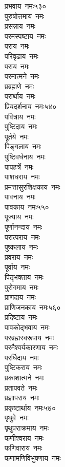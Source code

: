 \begin{multicols}{\maxColumns}
\begin{flushleft}
प्रभवाय~नमः\hfill ५३०\\
पुरुषोत्तमाय~नमः\\
प्रसन्नाय~नमः\\
परमस्पष्टाय~नमः\\
पराय~नमः\\
परिवृढाय~नमः\\
पराय~नमः\\
परमात्मने~नमः\\
प्रब्रह्मणे~नमः\\
परार्थाय~नमः\\
प्रियदर्शनाय~नमः\hfill ५४०\\
पवित्राय~नमः\\
पुष्टिदाय~नमः\\
पूर्तये~नमः\\
पिङ्गलाय~नमः\\
पुष्टिवर्धनाय~नमः\\
पापहर्त्रे~नमः\\
पाशधराय~नमः\\
प्रमत्तासुरशिक्षकाय~नमः\\
पावनाय~नमः\\
पावकाय~नमः\hfill ५५०\\
पूज्याय~नमः\\
पूर्णानन्दाय~नमः\\
परात्पराय~नमः\\
पुष्कलाय~नमः\\
प्रवराय~नमः\\
पूर्वाय~नमः\\
पितृभक्ताय~नमः\\
पुरोगमाय~नमः\\
प्राणदाय~नमः\\
प्राणिजनकाय~नमः\hfill ५६०\\
प्रदिष्टाय~नमः\\
पावकोद्भवाय~नमः\\
परब्रह्मस्वरूपाय~नमः\\
परमैश्वर्यकारणाय~नमः\\
परर्धिदाय~नमः\\
पुष्टिकराय~नमः\\
प्रकाशात्मने~नमः\\
प्रतापवते~नमः\\
प्रज्ञापराय~नमः\\
प्रकृष्टार्थाय~नमः\hfill ५७०\\
पृथुवे~नमः\\
पृथुपराक्रमाय~नमः\\
फणीश्वराय~नमः\\
फणिवाराय~नमः\\
फणामणिविभुषणाय~नमः\\

\end{flushleft}
\end{multicols}
